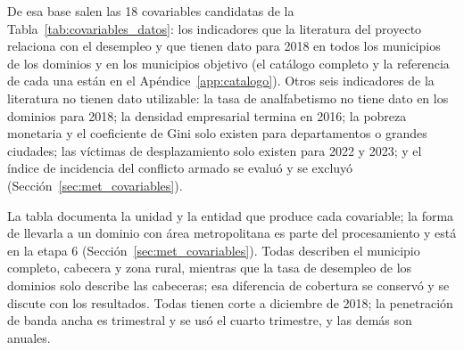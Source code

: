 De esa base salen las 18 covariables candidatas de la Tabla~\ref{tab:covariables_datos}: los indicadores que la literatura del proyecto relaciona con el desempleo y que tienen dato para 2018 en todos los municipios de los dominios y en los municipios objetivo (el catálogo completo y la referencia de cada una están en el Apéndice~\ref{app:catalogo}). Otros seis indicadores de la literatura no tienen dato utilizable: la tasa de analfabetismo no tiene dato en los dominios para 2018; la densidad empresarial termina en 2016; la pobreza monetaria y el coeficiente de Gini solo existen para departamentos o grandes ciudades; las víctimas de desplazamiento solo existen para 2022 y 2023; y el índice de incidencia del conflicto armado se evaluó y se excluyó (Sección~\ref{sec:met_covariables}).

La tabla documenta la unidad y la entidad que produce cada covariable; la forma de llevarla a un dominio con área metropolitana es parte del procesamiento y está en la etapa 6 (Sección~\ref{sec:met_covariables}). Todas describen el municipio completo, cabecera y zona rural, mientras que la tasa de desempleo de los dominios solo describe las cabeceras; esa diferencia de cobertura se conservó y se discute con los resultados. Todas tienen corte a diciembre de 2018; la penetración de banda ancha es trimestral y se usó el cuarto trimestre, y las demás son anuales.

